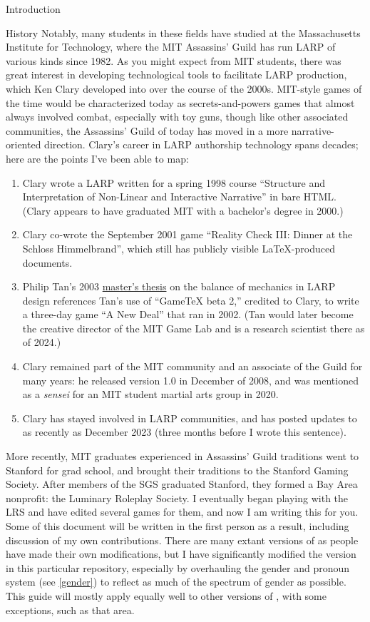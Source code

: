 \documentclass[sheet]{GameTexBase}
\begin{document}
\begin{section}{Introduction}
\begin{subsection}{History}
Notably, many students in these fields have studied at the Massachusetts Institute for Technology, where the MIT Assassins' Guild has run LARP of various kinds since 1982.
As you might expect from MIT students, there was great interest in developing technological tools to facilitate LARP production, which Ken Clary developed into \gametex{} over the course of the 2000s.
MIT-style games of the time would be characterized today as secrets-and-powers games that almost always involved combat, especially with toy guns, though like other associated communities, the Assassins' Guild of today
has moved in a more narrative-oriented direction.
Clary's career in LARP authorship technology spans decades; here are the points I've been able to map:
\begin{enumerate}
\item Clary wrote a LARP written for a spring 1998 course ``Structure and Interpretation of Non-Linear and Interactive Narrative'' in bare HTML.  (Clary appears to have graduated MIT with a bachelor's degree in 2000.)
\item Clary co-wrote the September 2001 game  ``Reality Check III: Dinner at the Schloss Himmelbrand'', which still has publicly visible \LaTeX{}-produced documents.
\item Philip Tan's 2003 \href{https://drive.google.com/file/d/1RiGc2OWtXIPlebHVrixv2IpAbSGAThtd/view?usp=sharing}{master's thesis} on the balance of mechanics in LARP design references Tan's use of ``GameTeX beta 2,'' credited to Clary, to write a three-day game ``A New Deal'' that ran in 2002.  (Tan would later become the creative director of the MIT Game Lab and is a research scientist there as of 2024.)
\item Clary remained part of the MIT community and an associate of the Guild for many years: he released \gametex{} version 1.0 in December of 2008, and was mentioned as a \emph{sensei} for an MIT student martial arts group in 2020.
\item Clary has stayed involved in LARP communities, and has posted updates to \gametex{} as recently as December 2023 (three months before I wrote this sentence).
\end{enumerate}
More recently, MIT graduates experienced in Assassins' Guild traditions went to Stanford for grad school, and brought their traditions to the Stanford Gaming Society.  After members of the SGS graduated Stanford, they formed a Bay Area nonprofit: the Luminary Roleplay Society.  I eventually began playing with the LRS and have edited several games for them, and now I am writing this for you.  Some of this document will be written in the first person as a result, including discussion of my own contributions.  There are many extant versions of \gametex{} as people have made their own modifications, but I have significantly modified the version in this particular repository, especially by overhauling the gender and pronoun system (see \ref{gender}) to reflect as much of the spectrum of gender as possible.  This guide will mostly apply equally well to other versions of \gametex{}, with some exceptions, such as that area.

\end{subsection}
\end{section}
\end{document}
